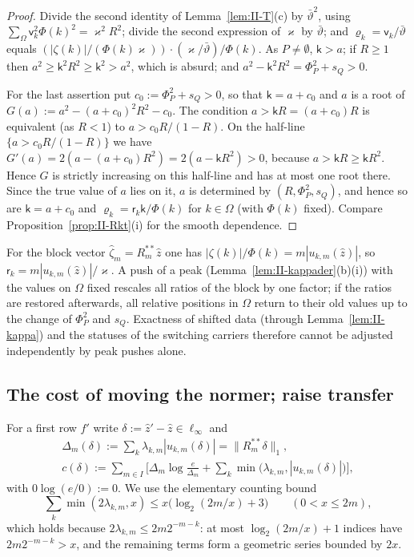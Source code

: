 \documentclass[10pt]{amsart}
\theoremstyle{definition}
\theoremstyle{remark}
\newcommand{\zh}{\hat z}
\begin{document}
\begin{proof}
Divide the second identity of Lemma~\ref{lem:II-T}(c) by $\bar\vartheta^2$,
using $\sum_\Omega\mathsf v_k^2\Phi(k)^2=\varkappa^2R^2$; divide the second
expression of $\varkappa$ by $\bar\vartheta$; and $\varrho_k=\mathsf v_k/\bar\vartheta$ equals
$(|\zeta(k)|/(\Phi(k)\varkappa))\cdot(\varkappa/\bar\vartheta)/\Phi(k)$.
As $P\ne\emptyset$, $\mathsf k>a$; if $R\ge1$ then $a^2\ge\mathsf k^2R^2\ge
\mathsf k^2>a^2$, which is absurd; and $a^2-\mathsf k^2R^2=\Phi_P^2+s_Q>0$.

For the last assertion put $c_0:=\Phi_P^2+s_Q>0$, so that $\mathsf k=a+c_0$
and $a$ is a root of $G(a):=a^2-(a+c_0)^2R^2-c_0$.  The condition $a>\mathsf
kR=(a+c_0)R$ is equivalent (as $R<1$) to $a>c_0R/(1-R)$.  On the half-line
$\{a>c_0R/(1-R)\}$ we have $G'(a)=2(a-(a+c_0)R^2)=2(a-\mathsf kR^2)>0$,
because $a>\mathsf kR\ge\mathsf kR^2$.  Hence $G$ is strictly increasing on
this half-line and has at most one root there.  Since the true value of $a$
lies on it, $a$ is determined by $(R,\Phi_P^2,s_Q)$, and hence so are
$\mathsf k=a+c_0$ and $\varrho_k=\mathsf r_k\mathsf k/\Phi(k)$ for $k\in
\Omega$ (with $\Phi(k)$ fixed).  Compare Proposition~\ref{prop:II-Rkt}(i)
for the smooth dependence.
\end{proof}

For the block vector $\hat\zeta_m=R_m^{**}\zh$ one has $|\zeta(k)|/\Phi(k)=
m|u_{k,m}(\zh)|$, so $\mathsf r_k=m|u_{k,m}(\zh)|/\varkappa$.  A push of a
peak (Lemma~\ref{lem:II-kappader}(b)(i)) with the values on $\Omega$ fixed
rescales all ratios of the block by one factor; if the ratios are restored
afterwards, all relative positions in $\Omega$ return to their old values up
to the change of $\Phi_P^2$ and $s_Q$.  Exactness of shifted data
(through Lemma~\ref{lem:II-kappa}) and the statuses of the switching
carriers therefore cannot be adjusted independently by peak pushes alone.

\subsection{The cost of moving the normer; raise transfer}\label{subsec:II-cost}

For a first row $f'$ write $\delta:=\zh'-\zh\in\ell_\infty$ and
\[
 \begin{gathered}
 \Delta_m(\delta):=\sum_k\lambda_{k,m}|u_{k,m}(\delta)|=\|R_m^{**}\delta\|_1,\\
 c(\delta):=\sum_{m\in I}\Big[\Delta_m\log\frac e{\Delta_m}+\sum_k
 \min\big(\lambda_{k,m},|u_{k,m}(\delta)|\big)\Big],
 \end{gathered}
\]
with $0\log(e/0):=0$.  We use the elementary counting bound
\begin{equation}\label{eq:II-count}
 \sum_k\min(2\lambda_{k,m},x)\le x\big(\log_2(2m/x)+3\big)\qquad(0<x\le2m),
\end{equation}
which holds because $2\lambda_{k,m}\le2m2^{-m-k}$: at most
$\log_2(2m/x)+1$ indices have $2m2^{-m-k}>x$, and the remaining terms form a
geometric series bounded by $2x$.
\end{document}
